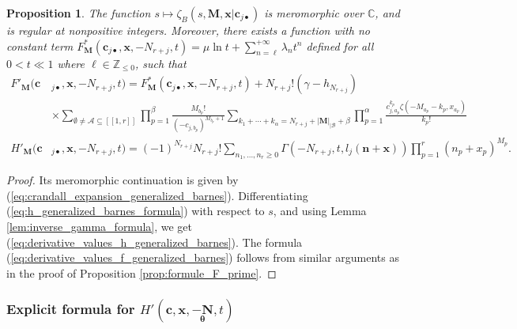 \documentclass[a4paper]{amsart}
\newtheorem{proposition}[theorem]{Proposition}
\theoremstyle{remark}
\theoremstyle{definition}
\begin{document}
\begin{proposition}
\label{prop:derivative_values_generalized_barnes}
The function $s \mapsto \zeta_B(s,\mathbf{M},\mathbf{x}|\mathbf{c}_{j\bullet})$ is meromorphic over $\mathbb{C}$, and is regular at nonpositive integers. Moreover, there exists a function with no constant term $F^*_{\mathbf{M}}(\mathbf{c}_{j \bullet},\mathbf{x},-N_{r+j},t) = \mu \ln t + \sum_{n=\ell}^{+\infty} \lambda_n t^{n}$ defined for all $0 < t \ll 1$ where $\ell \in \mathbb{Z}_{\leq 0}$, such that
\begin{align}
    F'_{\mathbf{M}}(\mathbf{c}&_{j \bullet},\mathbf{x},-N_{r+j},t) = F^*_{\mathbf{M}}(\mathbf{c}_{j \bullet},\mathbf{x},-N_{r+j},t) +N_{r+j}! (\gamma-h_{N_{r+j}}) \label{eq:derivative_values_f_generalized_barnes} \\
    & \times \sum_{\emptyset \neq \mathcal{A} \subseteq [\![1,r]\!]} \prod_{p=1}^{\beta} \frac{M_{b_p}!}{(-c_{j,b_p})^{M_{b_p}+1}} \sum_{k_1+\cdots+k_{\alpha}=N_{r+j}+|\mathbf{M}|_{|\mathcal{B}}+\beta} \prod_{p=1}^{\alpha} \frac{c_{j,a_p}^{k_p}\zeta(-M_{a_p}-k_p,x_{a_p})}{k_p!} \nonumber \\
    H'_{\mathbf{M}}(\mathbf{c}&_{j \bullet},\mathbf{x},-N_{r+j},t) = (-1)^{N_{r+j}} N_{r+j}! \sum_{n_1,\ldots,n_r \geq 0} \Gamma(-N_{r+j},t,l_j(\mathbf{n}+\mathbf{x})) \prod_{p=1}^{r} (n_p+x_p)^{M_p}. \label{eq:derivative_values_h_generalized_barnes}
\end{align}
\end{proposition}

\begin{proof}
Its meromorphic continuation is given by (\ref{eq:crandall_expansion_generalized_barnes}). Differentiating (\ref{eq:h_generalized_barnes_formula}) with respect to $s$, and using Lemma \ref{lem:inverse_gamma_formula}, we get (\ref{eq:derivative_values_h_generalized_barnes}). The formula (\ref{eq:derivative_values_f_generalized_barnes}) follows from similar arguments as in the proof of Proposition \ref{prop:formule_F_prime}.
\end{proof}

\subsubsection{Explicit formula for \texorpdfstring{$H'(\mathbf{c},\mathbf{x},\underset{\bm{\theta}}{-\mathbf{N}},t)$}{directionalderivativeh}}
\end{document}

